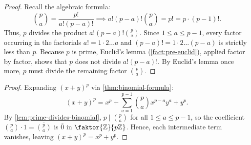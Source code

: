 \begin{content}

\begin{proof}
Recall the algebraic formula:
\[
\binom{p}{a} = \frac{p!}{a! (p-a)!} \implies a! (p-a)! \binom{p}{a} = p! = p \cdot (p-1)!.
\]
Thus, $p$ divides the product $a! (p-a)! \binom{p}{a}$. Since $1 \le a \le p-1$, every factor occurring in the factorials $a! = 1 \cdot 2 \dots a$ and $(p-a)! = 1 \cdot 2 \dots (p-a)$ is strictly less than $p$. Because $p$ is prime, Euclid's lemma (\cref{fact:pre-euclid}), applied factor by factor, shows that $p$ does not divide $a! (p-a)!$. By Euclid's lemma once more, $p$ must divide the remaining factor $\binom{p}{a}$.
\end{proof}


\begin{proof}
Expanding $(x + y)^p$ via \cref{thm:binomial-formula}:
\[
(x + y)^p = x^p + \sum_{a=1}^{p-1} \binom{p}{a} x^{p-a} y^a + y^p.
\]
By \cref{lem:prime-divides-binomial}, $p \mid \binom{p}{a}$ for all $1 \le a \le p-1$, so the coefficient $\binom{p}{a} \cdot 1 = \overline{\binom{p}{a}}$ is $\bar{0}$ in $\faktor{\mathbb{Z}}{p\mathbb{Z}}$. Hence, each intermediate term vanishes, leaving $(x + y)^p = x^p + y^p$.
\end{proof}
\end{content}

